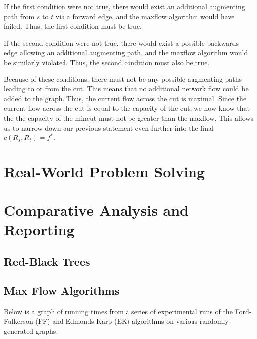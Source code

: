 \documentclass[12pt]{amsart}
\begin{document}
    If the first condition were not true, there would exist an
    additional augmenting path from $s$ to $t$ via a forward
    edge, and the maxflow algorithm would have failed. Thus, the
    first condition must be true.

    If the second condition were not true, there would exist a
    possible backwards edge allowing an additional augmenting
    path, and the maxflow algorithm would be similarly violated.
    Thus, the second condition must also be true.

    Because of these conditions, there must not be any possible
    augmenting paths leading to or from the cut. This means that
    no additional network flow could be added to the graph.
    Thus, the current flow across the cut is maximal. Since the
    current flow across the cut is equal to the capacity of the
    cut, we now know that the the capacity of the mincut must
    not be greater than the maxflow. This allows us to narrow
    down our previous statement even further into the final
    $c(R_s, R_t) = f^*$.

\section{Real-World Problem Solving}


\section{Comparative Analysis and Reporting}

\subsection{Red-Black Trees}


\subsection{Max Flow Algorithms}
    Below is a graph of running times from a series of
    experimental runs of the Ford-Fulkerson (FF) and
    Edmonds-Karp (EK) algorithms on various randomly-generated
    graphs.
\end{document}
